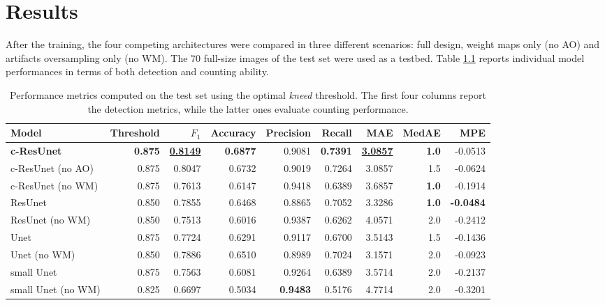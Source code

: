 \chapter{Results}
\label{chap:partI_results}

After the training, the four competing architectures were compared in three different scenarios: full design, weight maps only (no AO) and artifacts oversampling only (no WM). 
The 70 full-size images of the test set were used as a testbed.
Table \ref{tab:metrics} reports individual model performances in terms of both detection and counting ability.
\begin{table}[H]
\begin{center}
{
\begin{tabular}{lrrrrrrrr}
\toprule
Model &  Threshold &      $F_1$ &  Accuracy &  Precision &  Recall &     MAE &  MedAE &     MPE \\
\midrule
\textbf{c-ResUnet}          &      \textbf{0.875} &  \underline{\textbf{0.8149}} &    \textbf{0.6877} &     0.9081 &  \textbf{0.7391} &  \underline{\textbf{3.0857}} &    \textbf{1.0} & -0.0513 \\
c-ResUnet (no AO)  &      0.875 &  0.8047 &    0.6732 &     0.9019 &  0.7264 &  3.0857 &    1.5 & -0.0624 \\
c-ResUnet (no WM)  &      0.875 &  0.7613 &    0.6147 &     0.9418 &  0.6389 &  3.6857 &    \textbf{1.0} & -0.1914 \\
\midrule
ResUnet            &      0.850 &  0.7855 &    0.6468 &     0.8865 &  0.7052 &  3.3286 &    \textbf{1.0} & \textbf{-0.0484} \\
ResUnet (no WM)    &      0.850 &  0.7513 &    0.6016 &     0.9387 &  0.6262 &  4.0571 &    2.0 & -0.2412 \\
Unet               &      0.875 &  0.7724 &    0.6291 &     0.9117 &  0.6700 &  3.5143 &    1.5 & -0.1436 \\
Unet (no WM)       &      0.850 &  0.7886 &    0.6510 &     0.8989 &  0.7024 &  3.1571 &    2.0 & -0.0923 \\
small Unet         &      0.875 &  0.7563 &    0.6081 &     0.9264 &  0.6389 &  3.5714 &    2.0 & -0.2137 \\
small Unet (no WM) &      0.825 &  0.6697 &    0.5034 &     \textbf{0.9483} &  0.5176 &  4.7714 &    2.0 & -0.3201 \\
\bottomrule
\end{tabular}
\caption{
Performance metrics computed on the test set using the optimal \textit{kneed} threshold. The first four columns report the detection metrics, while the latter ones evaluate counting performance.
}
\label{tab:metrics}
}
\end{center}
\end{table}

